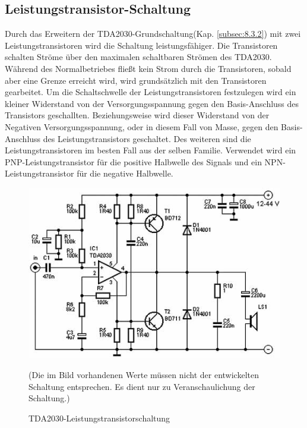\subsection{Leistungstransistor-Schaltung}\label{subsec:8.3.3}
Durch das Erweitern der TDA2030-Grundschaltung(Kap. \ref{subsec:8.3.2}) mit zwei Leistungstransistoren wird die Schaltung leistungsfähiger.
Die Transistoren schalten Ströme über den maximalen schaltbaren Strömen des TDA2030. Während des Normalbetriebes fließt kein Strom durch die Transistoren, sobald aber eine Grenze erreicht wird, wird grundsätzlich mit den Transistoren gearbeitet.
Um die Schaltschwelle der Leistungstransistoren festzulegen wird ein kleiner Widerstand von der Versorgungsspannung gegen den Basis-Anschluss des Transistors geschallten.
Beziehungsweise wird dieser Widerstand von der Negativen Versorgungsspannung, oder in diesem Fall von Masse, gegen den Basis-Anschluss des Leistungstransistors geschaltet.
Des weiteren sind die Leistungstransistoren im besten Fall aus der selben Familie.
Verwendet wird ein PNP-Leistungstransistor für die positive Halbwelle des Signals und ein NPN-Leistungstransistor für die negative Halbwelle.
\begin{figure} [H]
	\centering
	\includegraphics[width=1\textwidth]{img/Grundlagen/TDA2030/TDA2030-Leistungstransschaltung.jpg}
	\caption[TDA2030-Leistungstransistorschaltung]{TDA2030-Leistungstransistorschaltung\footnotemark}
	\text (Die im Bild vorhandenen Werte müssen nicht der entwickelten Schaltung entsprechen. Es dient nur zu Veranschaulichung der Schaltung.)
	\label {fig:8.3.3.1}
\end{figure}

